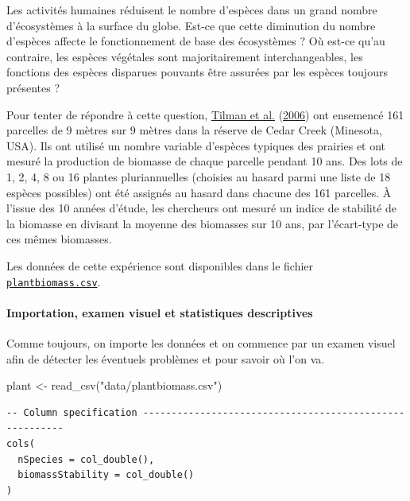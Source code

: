 \documentclass[
  a4paper,
]{article}
\newenvironment{Shaded}{\begin{snugshade}}{\end{snugshade}}
\newcommand{\FunctionTok}[1]{\textcolor[rgb]{0.39,0.29,0.61}{#1}}
\newcommand{\NormalTok}[1]{\textcolor[rgb]{0.12,0.11,0.11}{#1}}
\newcommand{\OtherTok}[1]{\textcolor[rgb]{0.00,0.43,0.16}{#1}}
\newcommand{\StringTok}[1]{\textcolor[rgb]{0.75,0.01,0.01}{#1}}
\begin{document}
Les activités humaines réduisent le nombre d'espèces dans un grand nombre d'écosystèmes à la surface du globe. Est-ce que cette diminution du nombre d'espèces affecte le fonctionnement de base des écosystèmes ? Où est-ce qu'au contraire, les espèces végétales sont majoritairement interchangeables, les fonctions des espèces disparues pouvants être assurées par les espèces toujours présentes ?

Pour tenter de répondre à cette question, \protect\hyperlink{ref-tilman2006}{Tilman et al.} (\protect\hyperlink{ref-tilman2006}{2006}) ont ensemencé 161 parcelles de 9 mètres sur 9 mètres dans la réserve de Cedar Creek (Minesota, USA). Ils ont utilisé un nombre variable d'espèces typiques des prairies et ont mesuré la production de biomasse de chaque parcelle pendant 10 ans. Des lots de 1, 2, 4, 8 ou 16 plantes pluriannuelles (choisies au hasard parmi une liste de 18 espèces possibles) ont été assignés au hasard dans chacune des 161 parcelles. À l'issue des 10 années d'étude, les chercheurs ont mesuré un indice de stabilité de la biomasse en divisant la moyenne des biomasses sur 10 ans, par l'écart-type de ces mêmes biomasses.

Les données de cette expérience sont disponibles dans le fichier \href{https://besibo.github.io/Biometrie3/data/plantbiomass.csv}{\texttt{plantbiomass.csv}}.

\hypertarget{importation-examen-visuel-et-statistiques-descriptives}{%
\paragraph{Importation, examen visuel et statistiques descriptives}\label{importation-examen-visuel-et-statistiques-descriptives}}

Comme toujours, on importe les données et on commence par un examen visuel afin de détecter les éventuels problèmes et pour savoir où l'on va.

\begin{Shaded}
\begin{Highlighting}[]
\NormalTok{plant }\OtherTok{\textless{}{-}} \FunctionTok{read\_csv}\NormalTok{(}\StringTok{"data/plantbiomass.csv"}\NormalTok{)}
\end{Highlighting}
\end{Shaded}

\begin{verbatim}
-- Column specification --------------------------------------------------------
cols(
  nSpecies = col_double(),
  biomassStability = col_double()
)
\end{verbatim}
\end{document}

